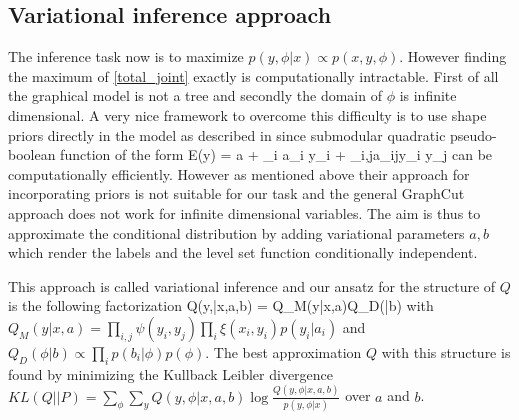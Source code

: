 \documentclass{article} %
\begin{document}
\subsection{Variational inference approach}
The inference task now is to maximize $p(y,\phi|x) \propto p(x,y,\phi)$. However finding the maximum of \eqref{total_joint} exactly is computationally intractable. First of all the graphical model is not a tree and secondly the domain of $\phi$ is infinite dimensional. A very nice framework to overcome this difficulty is to use shape priors directly in the model as described in \cite{Lempitsky_BranchMin} since submodular quadratic pseudo-boolean function of the form
\beqs
E(y) = a + \sum_i a_i y_i + \sum_{i,j}a_{ij}y_i y_j
\eeqs
can be computationally efficiently. However as mentioned above their approach for incorporating priors is not suitable for our task and the general GraphCut approach does not work for infinite dimensional variables. The aim is thus to approximate the conditional distribution by adding variational parameters $a,b$ which render the labels and the level set function conditionally independent. 



This approach is called variational inference \cite{Jordan99_Variational, Wainwright_Variational} and our ansatz for the structure of $Q$ is the following factorization
\beq
\label{VariationalAnsatz}
Q(y,\phi|x,a,b) = Q_M(y|x,a)Q_D(\phi|b) 
\eeq
with $Q_M(y|x,a) = \prod_{i,j} \psi(y_i,y_j) \prod_i  \xi(x_i,y_i) p(y_i|a_i)$ and $Q_D(\phi|b) \propto \prod_i p(b_i|\phi) p(\phi)$. 
The best approximation $Q$ with this structure is found by minimizing the Kullback Leibler divergence $KL(Q||P) = \sum_\phi \sum_y Q(y,\phi|x,a,b) \log \frac{Q(y,\phi|x,a,b)}{p(y,\phi|x)}$ over $a$ and $b$. 

\end{document}
